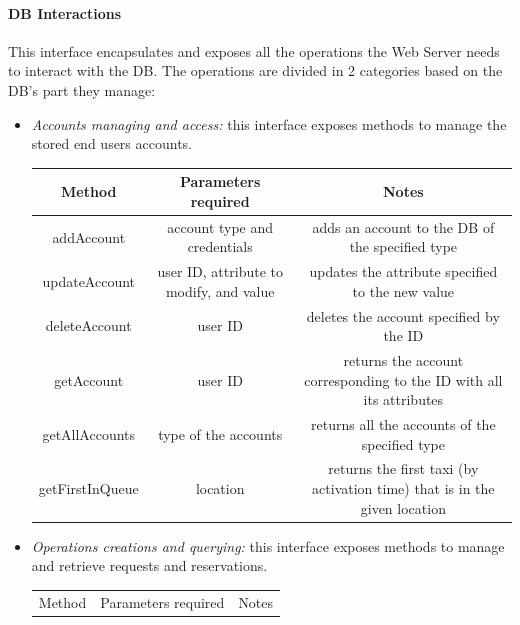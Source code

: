 \documentclass{article}
\begin{document}
\paragraph{DB Interactions}
This interface encapsulates and exposes all the operations the Web Server needs to interact with the DB\@. The operations are divided in 2 categories based on the DB's part they manage:
\begin{itemize}	
	\item \textit{Accounts managing and access:} this interface exposes methods to manage the stored end users accounts.\\	
	
	\begin{table}[H]
		\begin{adjustbox}{width=1.2\textwidth}
			\begin{tabular}{*{3}{c}}
				\toprule
				Method & Parameters required & Notes \\
				\midrule
				addAccount & account type and credentials & adds an account to the DB of the specified type\\
				updateAccount & user ID, attribute to modify, and value & updates the attribute specified to the new value\\ 
				deleteAccount & user ID & deletes the account specified by the ID \\
				getAccount & user ID & returns the account corresponding to the ID with all its attributes \\
				getAllAccounts & type of the accounts & returns all the accounts of the specified type \\
				getFirstInQueue & location & returns the first taxi (by activation time) that is in the given location\\
				\bottomrule
			\end{tabular}	
		\end{adjustbox}
	\end{table}
\item \textit{Operations creations and querying:} this interface exposes methods to manage and retrieve requests and reservations.\\	
	\begin{table}[H]
		\begin{adjustbox}{width=1.2\textwidth}
		\begin{tabular}{*{3}{c}}
			\toprule
			Method & Parameters required & Notes \\

\end{tabular}
\end{adjustbox}
\end{table}
\end{itemize}
\end{document}
